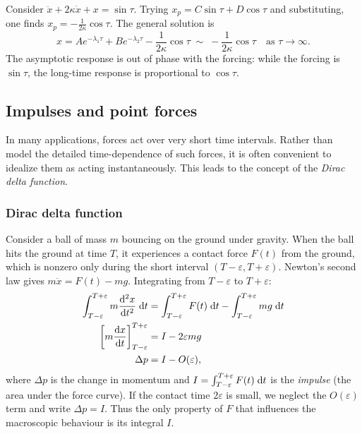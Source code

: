 \documentclass[a4paper]{article}
\begin{document}
\begin{eg}
  Consider $\ddot x + 2\kappa\dot x + x = \sin\tau$. Trying $x_p = C\sin\tau + D\cos\tau$ and substituting, one finds $x_p = -\frac{1}{2\kappa}\cos\tau$. The general solution is
  \[
    x = Ae^{-\lambda_1\tau} + Be^{-\lambda_2\tau} - \frac{1}{2\kappa}\cos\tau \;\sim\; -\frac{1}{2\kappa}\cos\tau \quad\text{as } \tau \to \infty.
  \]
  The asymptotic response is out of phase with the forcing: while the forcing is $\sin\tau$, the long-time response is proportional to $\cos\tau$.
\end{eg}
\subsection{Impulses and point forces}
\begin{remark}[Motivation]
  In many applications, forces act over very short time intervals. Rather than model the detailed time-dependence of such forces, it is often convenient to idealize them as acting instantaneously. This leads to the concept of the \emph{Dirac delta function}.
\end{remark}

\subsubsection{Dirac delta function}
\begin{eg}
  Consider a ball of mass $m$ bouncing on the ground under gravity. When the ball hits the ground at time $T$, it experiences a contact force $F(t)$ from the ground, which is nonzero only during the short interval $(T - \varepsilon, T + \varepsilon)$. Newton's second law gives $m\ddot x = F(t) - mg$. Integrating from $T - \varepsilon$ to $T + \varepsilon$:
  \begin{align*}
    \int_{T - \varepsilon}^{T + \varepsilon} m\frac{\mathrm{d} ^2 x}{\mathrm{d} t^2}\;\mathrm{d} t &= \int_{T - \varepsilon}^{T + \varepsilon} F(t)\;\mathrm{d} t - \int_{T - \varepsilon}^{T + \varepsilon} mg\;\mathrm{d} t\\
    \left[ m\frac{\mathrm{d} x}{\mathrm{d} t}\right]^{T + \varepsilon}_{T - \varepsilon} &= I - 2\varepsilon mg\\
    \Delta p &= I - O(\varepsilon),
  \end{align*}
  where $\Delta p$ is the change in momentum and $I = \int_{T - \varepsilon}^{T + \varepsilon} F(t) \;\mathrm{d} t$ is the \emph{impulse} (the area under the force curve). If the contact time $2\varepsilon$ is small, we neglect the $O(\varepsilon)$ term and write $\Delta p = I$. Thus the only property of $F$ that influences the macroscopic behaviour is its integral $I$.
\end{eg}
\end{document}

